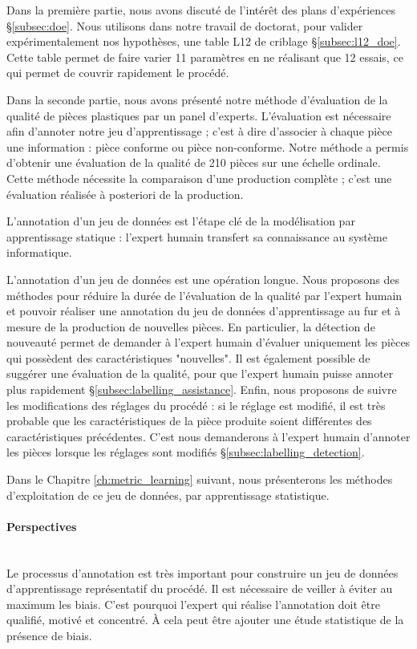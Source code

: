 Dans la première partie, nous avons discuté de l'intérêt des plans d'expériences §\ref{subsec:doe}.
Nous utilisons dans notre travail de doctorat, pour valider expérimentalement nos hypothèses, une table L12 de criblage §\ref{subsec:l12_doe}.
Cette table permet de faire varier 11 paramètres en ne réalisant que 12 essais, ce qui permet de couvrir rapidement le procédé.

Dans la seconde partie, nous avons présenté notre méthode d'évaluation de la qualité de pièces plastiques par un panel d'experts.
L'évaluation est nécessaire afin d'annoter notre jeu d'apprentissage ; c'est à dire d'associer à chaque pièce une information : pièce conforme ou pièce non-conforme.
Notre méthode a permis d'obtenir une évaluation de la qualité de 210 pièces sur une échelle ordinale.
Cette méthode nécessite la comparaison d'une production complète ; c'est une évaluation réalisée à posteriori de la production.

L'annotation d'un jeu de données est l'étape clé de la modélisation par apprentissage statique : l'expert humain transfert sa connaissance au système informatique.

L'annotation d'un jeu de données est une opération longue.
Nous proposons des méthodes pour réduire la durée de l'évaluation de la qualité par l'expert humain et pouvoir réaliser une annotation du jeu de données d'apprentissage au fur et à mesure de la production de nouvelles pièces.
En particulier, la détection de nouveauté permet de demander à l'expert humain d'évaluer uniquement les pièces qui possèdent des caractéristiques "nouvelles".
Il est également possible de suggérer une évaluation de la qualité, pour que l'expert humain puisse annoter plus rapidement §\ref{subsec:labelling_assistance}.
Enfin, nous proposons de suivre les modifications des réglages du procédé : si le réglage est modifié, il est très probable que les caractéristiques de la pièce produite soient différentes des caractéristiques précédentes.
C'est nous demanderons à l'expert humain d'annoter les pièces lorsque les réglages sont modifiés §\ref{subsec:labelling_detection}.

Dans le Chapitre \ref{ch:metric_learning} suivant, nous présenterons les méthodes d'exploitation de ce jeu de données, par apprentissage statistique.

\paragraph{Perspectives}\mbox{} \\
Le processus d'annotation est très important pour construire un jeu de données d'apprentissage représentatif du procédé.
Il est nécessaire de veiller à éviter au maximum les biais.
C'est pourquoi l'expert qui réalise l'annotation doit être qualifié, motivé et concentré.
À cela peut être ajouter une étude statistique de la présence de biais.


